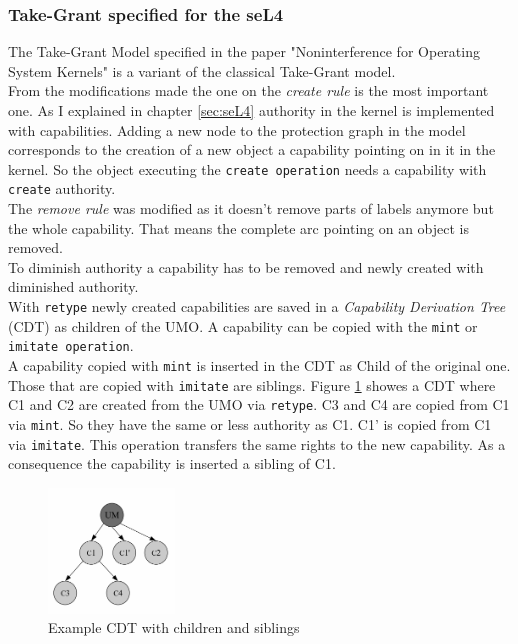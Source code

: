 \documentclass[11pt,a4paper,twoside]{article}
\begin{document}
	\subsubsection{Take-Grant specified for the seL4}
	The Take-Grant Model specified in the paper "Noninterference for Operating System Kernels" \cite{TakeG} is a variant of the classical Take-Grant model. \\
	From the modifications made the one on the \textit{create rule} is the most important one. As I explained in chapter \ref{sec:seL4} authority in the kernel is implemented with capabilities. Adding a new node to the protection graph in the model corresponds to the creation of a new object a capability pointing on in it in the kernel. So the object executing the \texttt{create operation} needs a capability with \texttt{create} authority. \\
	The \textit{remove rule} was modified as it doesn't remove parts of labels anymore but the whole capability. That means the complete arc pointing on an object is removed. \\
	To diminish authority a capability has to be removed and newly created with diminished authority. \\
	With \texttt{retype} newly created capabilities are saved in a \textit{Capability Derivation Tree} (CDT) as children of the UMO. A capability can be copied with the \texttt{mint} or \texttt{imitate operation}. \\ 
	A capability  copied with \texttt{mint} is inserted in the CDT as Child of the original one. Those that are copied with \texttt{imitate} are siblings. Figure \ref{fig:cdt} showes a CDT where C1 and C2 are created from the UMO via \texttt{retype}. C3 and C4 are copied from C1 via \texttt{mint}. So they have the same or less authority as C1. C1' is copied from C1 via \texttt{imitate}. This operation transfers the same rights to the new capability. As a consequence the capability is inserted a sibling of C1. \\
	 \begin{figure}[H]
	\centering
		\includegraphics[width=0.3\textwidth]{./Pictures/CDT.jpg}
	\caption[CDT]{Example CDT with children and siblings \cite{PhDseL4}}
	\label{fig:cdt}
	\end{figure}
\end{document}
